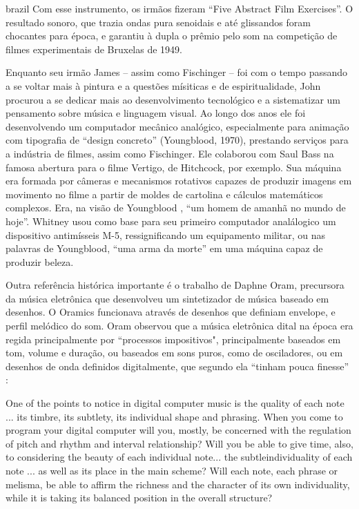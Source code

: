 \begin{otherlanguage*}{brazil}
Com esse instrumento, os irmãos fizeram ``Five Abstract Film Exercises''. O resultado sonoro, que trazia ondas pura senoidais e até glissandos foram chocantes para época, e garantiu à dupla o prêmio pelo som na competição de filmes experimentais de Bruxelas de 1949.

Enquanto seu irmão James – assim como Fischinger – foi com o tempo passando a se voltar mais à pintura e a questões mísiticas e de espiritualidade, John procurou a se dedicar mais ao desenvolvimento tecnológico e a sistematizar um pensamento sobre música e linguagem visual. Ao longo dos anos ele foi desenvolvendo um computador mecânico analógico, especialmente para animação com tipografia de ``design concreto'' (Youngblood, 1970), prestando serviços para a indústria de filmes, assim como Fischinger. Ele colaborou com Saul Bass na famosa abertura para o filme Vertigo, de Hitchcock, por exemplo. Sua máquina era formada por câmeras e mecanismos rotativos capazes de produzir imagens em movimento no filme a partir de moldes de cartolina e cálculos matemáticos complexos. Era, na visão de Youngblood \cite{Youngblood1970}, ``um homem de amanhã no mundo de hoje''. Whitney usou como base para seu primeiro computador analálogico um dispositivo antimísseis M-5, ressignificando um equipamento militar, ou nas palavras de Youngblood, ``uma arma da morte'' em uma máquina capaz de produzir beleza.

Outra referência histórica importante é o trabalho de Daphne Oram, precursora da música eletrônica que desenvolveu um sintetizador de música baseado em desenhos. O Oramics funcionava através de desenhos que definiam envelope, e perfil melódico do som. Oram observou que a música eletrônica dital na época era regida principalmente por ``processos impositivos", principalmente baseados em tom, volume e duração, ou baseados em sons puros, como de osciladores, ou em desenhos de onda definidos digitalmente, que segundo ela ``tinham pouca finesse'' \cite[101]{Oram1972}: 

\begin{citacao}
One of the points to notice in digital computer music is the
quality of each note ... its timbre, its subtlety, its individual shape and phrasing. When you come to program your digital computer will you, mostly, be concerned with the regulation of pitch and rhythm and interval relationship? Will you be able to give time, also, to considering the beauty of each individual note... the subtleindividuality of each note ... as well as its place in the main scheme? Will each note, each phrase or melisma, be able to affirm the richness and the character of its own individuality, while it is taking its balanced position in the overall structure? 


\end{citacao}
\end{otherlanguage*}
